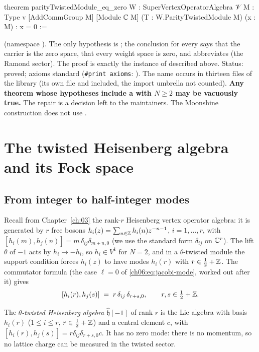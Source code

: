 \begin{warning}
\begin{leancode}
theorem parityTwistedModule_eq_zero {W : SuperVertexOperatorAlgebra 𝒱} {M : Type v}
    [AddCommGroup M] [Module ℂ M] (T : W.ParityTwistedModule M) (x : M) : x = 0 :=
\end{leancode}
(namespace ).  The only hypothesis is ; the conclusion
 for every  says that the carrier is the zero space, 
that every weight space is zero, and  abbreviates
 (the Ramond sector).  The proof is exactly the
instance of  described above.  Status: proved; axioms standard
(\texttt{\#print axioms}: ).  The name occurs in thirteen files of the library (its own
file and  included, the import umbrella  not counted).  \textbf{Any theorem whose hypotheses include a  with
$N\ge 2$ may be vacuously true.}  The repair is a decision left to the maintainers.  The Moonshine
construction does not use .
\end{warning}

\section{The twisted Heisenberg algebra and its Fock space}\label{ch06:sec:heis}

\subsection{From integer to half-integer modes}

Recall from Chapter~\ref{ch:03} the rank-$r$ Heisenberg vertex operator algebra: it is generated by
$r$ free bosons $h_i(z)=\sum_{n\in{\mathbb{Z}}}h_i(n)z^{-n-1}$, $i=1,\dots,r$, with
$[h_i(m),h_j(n)]=m\,\delta_{ij}\delta_{m+n,0}$ (we use the standard form $\delta_{ij}$ on
${\mathbb{C}}^r$).  The lift $\theta$ of $-1$ acts by $h_i\mapsto-h_i$, so $h_i\in V^1$ for $N=2$, and in a
$\theta$-twisted module the support condition forces $h_i(z)$ to have modes $h_i(r)$ with
$r\in\frac12+{\mathbb{Z}}$.  The commutator formula (the case $\ell=0$ of \eqref{ch06:eq:jacobi-mode},
worked out after it) gives
\begin{equation}\label{ch06:eq:twheis}
  [h_i(r),h_j(s)] \;=\; r\,\delta_{ij}\,\delta_{r+s,0},\qquad r,s\in\tfrac12+{\mathbb{Z}} .
\end{equation}
\begin{definition}\label{ch06:def:twheis}
The \emph{$\theta$-twisted Heisenberg algebra} $\hat{\mathfrak h}[-1]$ of rank $r$ is the Lie
algebra with basis $h_i(r)$ ($1\le i\le r$, $r\in\frac12+{\mathbb{Z}}$) and a central element $c$, with
$[h_i(r),h_j(s)]=r\delta_{ij}\delta_{r+s,0}c$.  It has no zero mode: there is no momentum, so no
lattice charge can be measured in the twisted sector.
\end{definition}

